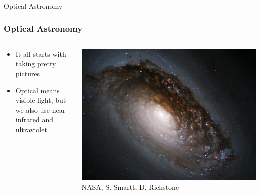 \documentclass{beamer}
\begin{document}
\frame
{

    {\huge Optical Astronomy}

}
\frame
{

    \frametitle{Optical Astronomy}


    \begin{columns}
        \begin{column}{0.5\textwidth}
            \begin{itemize}

                \item It all starts with taking pretty pictures

                \item Optical means visible light, but we also use near infrared
                    and ultraviolet.

            \end{itemize}
        \end{column}
        \begin{column}{0.5\textwidth}
            \begin{center}
                \includegraphics[width=\textwidth]{m64-black-eye-galaxy.jpg}
                \newline
                {\tiny NASA, S. Smartt, D. Richstone}
            \end{center}

            
        \end{column}
    \end{columns}


}
\end{document}
